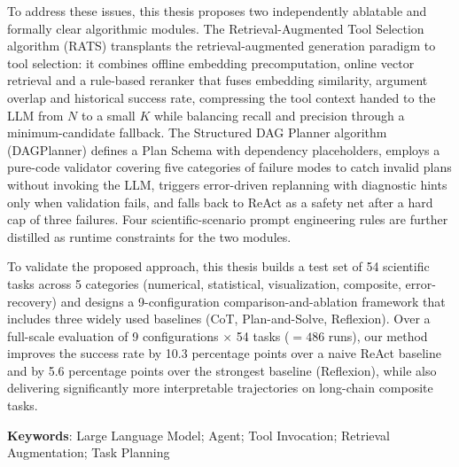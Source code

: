 To address these issues, this thesis proposes two independently ablatable and formally clear algorithmic modules.
The Retrieval-Augmented Tool Selection algorithm (RATS) transplants the retrieval-augmented generation paradigm to tool selection: it combines offline embedding precomputation, online vector retrieval and a rule-based reranker that fuses embedding similarity, argument overlap and historical success rate, compressing the tool context handed to the LLM from $N$ to a small $K$ while balancing recall and precision through a minimum-candidate fallback.
The Structured DAG Planner algorithm (DAGPlanner) defines a Plan Schema with dependency placeholders, employs a pure-code validator covering five categories of failure modes to catch invalid plans without invoking the LLM, triggers error-driven replanning with diagnostic hints only when validation fails, and falls back to ReAct as a safety net after a hard cap of three failures.
Four scientific-scenario prompt engineering rules are further distilled as runtime constraints for the two modules.

To validate the proposed approach, this thesis builds a test set of 54 scientific tasks across 5 categories (numerical, statistical, visualization, composite, error-recovery) and designs a 9-configuration comparison-and-ablation framework that includes three widely used baselines (CoT, Plan-and-Solve, Reflexion).
Over a full-scale evaluation of 9 configurations $\times$ 54 tasks ($=486$ runs), our method improves the success rate by 10.3 percentage points over a naive ReAct baseline and by 5.6 percentage points over the strongest baseline (Reflexion), while also delivering significantly more interpretable trajectories on long-chain composite tasks.

\textbf{Keywords}: Large Language Model; Agent; Tool Invocation; Retrieval Augmentation; Task Planning
